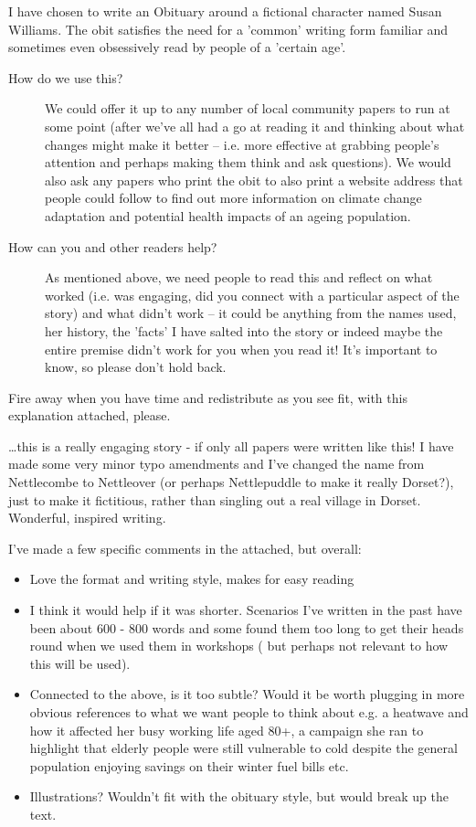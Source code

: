 I have chosen to write an Obituary around a fictional character named Susan Williams. The obit satisfies the need for a 'common' writing form familiar and sometimes even obsessively read by people of a 'certain age'.

\begin{description}
	\item [How do we use this?] We could offer it up to any number of local community papers to run at some point (after we've all had a go at reading it and thinking about what changes might make it better -- i.e. more effective at grabbing people's attention and perhaps making them think and ask questions). We would also ask any papers who print the obit to also print a website address that people could follow to find out more information on climate change adaptation and potential health impacts of an ageing population.
	\item [How can you and other readers help?] As mentioned above, we need people to read this and reflect on what worked (i.e. was engaging, did you connect with a particular aspect of the story) and what didn't work -- it could be anything from the names used, her history, the 'facts' I have salted into the story or indeed maybe the entire premise didn't work for you when you read it! It's important to know, so please don't hold back. 
\end{description}

Fire away when you have time and redistribute as you see fit, with this explanation attached, please.

\dots this is a really engaging story - if only all papers were written like this!  I have made some very minor typo amendments and I've changed the name from Nettlecombe to Nettleover (or perhaps Nettlepuddle to make it really Dorset?), just to make it fictitious, rather than singling out a real village in Dorset.  Wonderful, inspired writing.

I've made a few specific comments in the attached, but overall:

\begin{itemize}
	\item Love the format and writing style,  makes for easy reading
	\item I think it would help if it was shorter. Scenarios I've written in the past have been about 600 - 800 words and some found them too long to get their heads round when we used them in workshops ( but perhaps not relevant to how this will be used).
	\item Connected to the above, is it too subtle? Would it be worth plugging in more obvious references to what we want people to think about e.g. a heatwave and how it affected her busy working life aged 80+, a campaign she ran to highlight that elderly people were still vulnerable to cold despite the general population enjoying savings on their winter fuel bills etc.  
	\item Illustrations? Wouldn't fit with the obituary style, but would break up the text.
\end{itemize}

